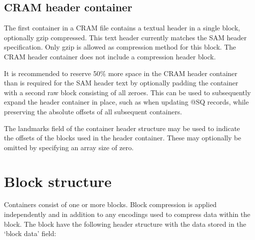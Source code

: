 \documentclass[a4paper]{article}
\begin{document}
\subsection{\textbf{CRAM header container}}

The first container in a CRAM file contains a textual header in a single block, optionally
gzip compressed. This text header currently matches the SAM header specification. Only
gzip is allowed as compression method for this block. The CRAM header container does not
include a compression header block.

It is recommended to reserve 50\% more space in the CRAM header container than
is required for the SAM header text by optionally padding the container with a second
raw block consisting of all zeroes. This can be used to subsequently expand the header
container in place, such as when updating @SQ records, while preserving the absolute
offsets of all subsequent containers.

The landmarks field of the container header structure may be used to
indicate the offsets of the blocks used in the header container.
These may optionally be omitted by specifying an array size of zero.

\section{\textbf{Block structure}}
\label{sec:block-struct}

Containers consist of one or more blocks. Block compression is applied independently 
and in addition to any encodings used to compress data within the block. The block 
have the following header structure with the data stored in the `block data' field:
\end{document}
